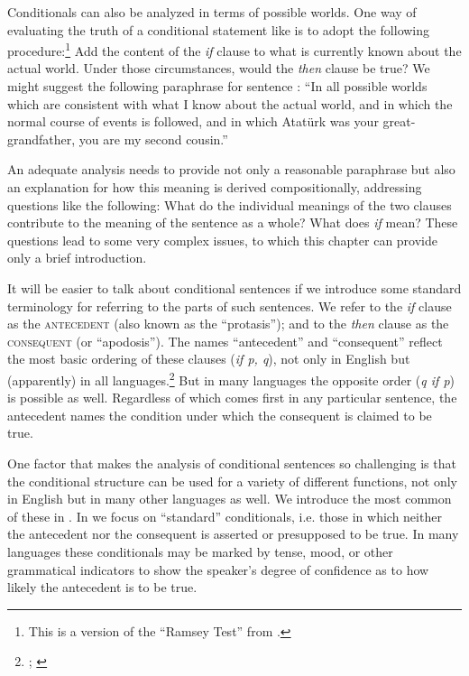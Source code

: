 Conditionals can also be analyzed in terms of possible worlds. One way of evaluating the truth of a conditional statement like  is to adopt the following procedure:\footnote{This is a version of the “Ramsey Test” from \citet{Stalnaker1968}.} Add the content of the \textit{if} clause to what is currently known about the actual world. Under those circumstances, would the \textit{then} clause be true? We might suggest the following paraphrase for sentence : “In all possible worlds which are consistent with what I know about the actual world, and in which the normal course of events is followed, and in which Atatürk was your great-grandfather, you are my second cousin.”



An adequate analysis needs to provide not only a reasonable paraphrase but also an explanation for how this meaning is derived compositionally, addressing questions like the following: What do the individual meanings of the two clauses contribute to the meaning of the sentence as a whole? What does \textit{if} mean? These questions lead to some very complex issues, to which this chapter can provide only a brief introduction.



It will be easier to talk about conditional sentences if we introduce some standard terminology for referring to the parts of such sentences. We refer to the \textit{if} clause as the \textsc{antecedent} (also known as the “protasis”); and to the \textit{then} clause as the \textsc{consequent} (or “apodosis”). The names “antecedent” and “consequent” reflect the most basic ordering of these clauses (\textit{if p, q}), not only in English but (apparently) in all languages.\footnote{\citet[84--85]{Greenberg1963}; \citet[83]{Comrie1986}} But in many languages the opposite order (\textit{q if p}) is possible as well. Regardless of which comes first in any particular sentence, the antecedent names the condition under which the consequent is claimed to be true.



One factor that makes the analysis of conditional sentences so challenging is that the conditional structure can be used for a variety of different functions, not only in English but in many other languages as well. We introduce the most common of these in . In  we focus on “standard” conditionals, i.e. those in which neither the antecedent nor the consequent is asserted or presupposed to be true. In many languages these conditionals may be marked by tense, mood, or other grammatical indicators to show the speaker’s degree of confidence as to how likely the antecedent is to be true.



